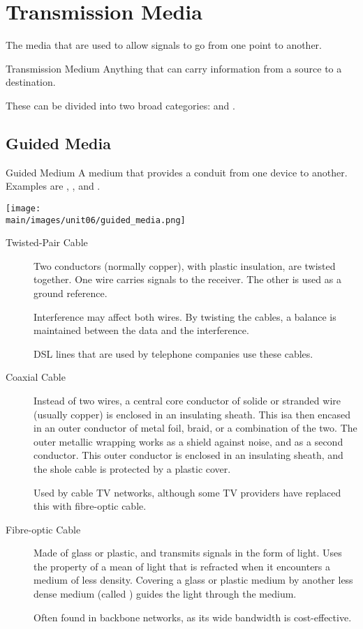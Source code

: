 \documentclass[\main/notes.tex]{subfiles}
\begin{document}
		\section{Transmission Media}
			The media that are used to allow signals to go from one point to another.
			\begin{definition}{Transmission Medium}
				Anything that can carry information from a source to a destination.
			\end{definition}
			These can be divided into two broad categories:  and .
			\subsection{Guided Media}
				\begin{definition}{Guided Medium}
					A medium that provides a conduit from one device to another. Examples are , , and .
					\begin{center}
						\texttt{[image: \\main/images/unit06/guided\_media.png]}
					\end{center}
				\end{definition}
				\begin{description}
					\item[Twisted-Pair Cable] Two conductors (normally copper), with plastic insulation, are twisted together. One wire carries signals to the receiver. The other is used as a ground reference.

						Interference may affect both wires. By twisting the cables, a balance is maintained between the data and the interference.

						DSL lines that are used by telephone companies use these cables.
					\item[Coaxial Cable] Instead of two wires, a central core conductor of solide or stranded wire (usually copper) is enclosed in an insulating sheath. This isa then encased in an outer conductor of metal foil, braid, or a combination of the two. The outer metallic wrapping works as a shield against noise, and as a second conductor. This outer conductor is enclosed in an insulating sheath, and the shole cable is protected by a plastic cover.

						Used by cable TV networks, although some TV providers have replaced this with fibre-optic cable.
					\item[Fibre-optic Cable] Made of glass or plastic, and transmits signals in the form of light. Uses the property of a mean of light that is refracted when it encounters a medium of less density. Covering a glass or plastic medium by another less dense medium (called ) guides the light through the medium.

						Often found in backbone networks, as its wide bandwidth is cost-effective.
				\end{description}
\end{document}
